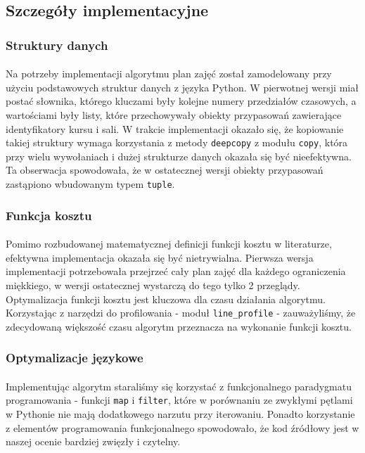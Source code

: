\subsection{Szczegóły implementacyjne}
\subsubsection{Struktury danych}
\paragraph{} Na potrzeby implementacji algorytmu plan zajęć został zamodelowany przy użyciu podstawowych struktur danych z języka Python. W pierwotnej wersji miał postać słownika, którego kluczami były kolejne numery przedziałów czasowych, a wartościami były listy, które przechowywały obiekty przypasowań zawierające identyfikatory kursu i sali. W trakcie implementacji okazało się, że kopiowanie takiej struktury wymaga korzystania z metody \verb#deepcopy# z modułu \verb#copy#, która przy wielu wywołaniach i dużej strukturze danych okazała się być nieefektywna. Ta obserwacja spowodowała, że w ostatecznej wersji obiekty przypasowań zastąpiono wbudowanym typem \verb#tuple#.
\subsubsection{Funkcja kosztu}
\paragraph{} Pomimo rozbudowanej matematycznej definicji funkcji kosztu w literaturze, efektywna implementacja okazała się być nietrywialna. Pierwsza wersja implementacji potrzebowała przejrzeć cały plan zajęć dla każdego ograniczenia miękkiego, w wersji ostatecznej wystarczą do tego tylko 2 przeglądy. Optymalizacja funkcji kosztu jest kluczowa dla czasu działania algorytmu. Korzystając z narzędzi do profilowania - moduł \verb#line_profile# - zauważyliśmy, że zdecydowaną większość czasu algorytm przeznacza na wykonanie funkcji kosztu.
\subsubsection{Optymalizacje językowe}
\paragraph{} Implementując algorytm staraliśmy się korzystać z funkcjonalnego paradygmatu programowania - funkcji \verb#map# i \verb#filter#, które w porównaniu ze zwykłymi pętlami w Pythonie nie mają dodatkowego narzutu przy iterowaniu. Ponadto korzystanie z elementów programowania funkcjonalnego spowodowało, że kod źródłowy jest w naszej ocenie bardziej zwięzły i czytelny.
